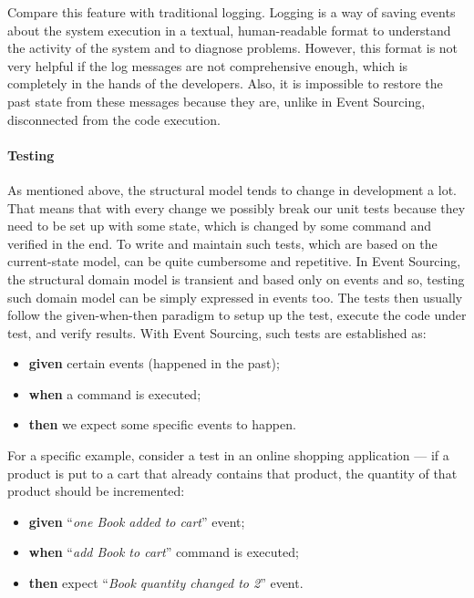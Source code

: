 \documentclass{book}
\begin{document}
Compare this feature with traditional logging. Logging is a way of
saving events about the system execution in a textual, human-readable
format to understand the activity of the system and to diagnose
problems. However, this format is not very helpful if the log messages
are not comprehensive enough, which is completely in the hands of the
developers. Also, it is impossible to restore the past state from
these messages because they are, unlike in Event Sourcing, disconnected
from the code execution.

\paragraph{Testing}\label{testing}

As mentioned above, the structural model tends to change in development a lot.
That means that with every change we possibly break our unit tests because they need
to be set up with some state, which is changed by some command and verified in the end.
To write and maintain such tests, which are based on the current-state model, can be quite cumbersome and repetitive.
In Event Sourcing, the structural domain model is transient and based only on events and so,
testing such domain model can be simply expressed in events too. The tests then usually follow
the given-when-then paradigm to setup up the test, execute the code under test, and verify results.
With Event Sourcing, such tests are established as:

\begin{itemize}
\tightlist
\item
  \textbf{given} certain events (happened in the past);
\item
  \textbf{when} a command is executed;
\item
  \textbf{then} we expect some specific events to happen.
\end{itemize}

For a specific example, consider a test in an online shopping application --- if a product
is put to a cart that already contains that product, the quantity of that product should be incremented:

\begin{itemize}
\tightlist
\item
  \textbf{given} ``\emph{one Book added to cart}'' event;
\item
  \textbf{when} ``\emph{add Book to cart}'' command is executed;
\item
  \textbf{then} expect ``\emph{Book quantity changed to 2}'' event.
\end{itemize}
\end{document}

